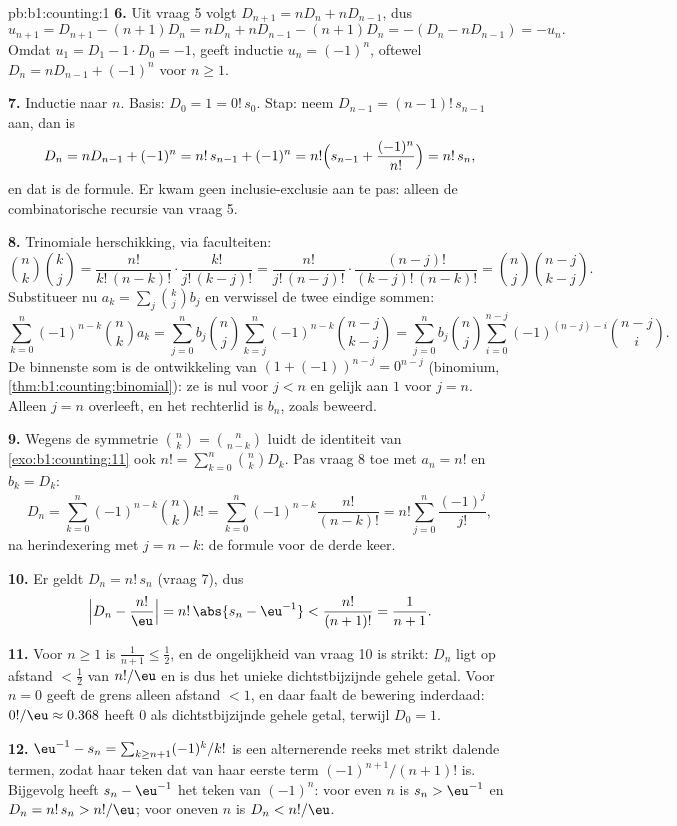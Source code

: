 \begin{solution}{pb:b1:counting:1}
\textbf{6.} Uit vraag 5 volgt $D_{n+1} = nD_n + nD_{n-1}$, dus
\[
u_{n+1} = D_{n+1} - (n+1)D_n = nD_n + nD_{n-1} - (n+1)D_n
= -(D_n - nD_{n-1}) = -u_n .
\]
Omdat $u_1 = D_1 - 1 \cdot D_0 = -1$, geeft inductie $u_n = (-1)^n$,
oftewel $D_n = nD_{n-1} + (-1)^n$ voor $n \geq 1$.

\textbf{7.} Inductie naar $n$. Basis: $D_0 = 1 = 0!\,s_0$. Stap: neem
$D_{n-1} = (n-1)!\,s_{n-1}$ aan, dan is
\[
D_n = nD_{n-1} + (-1)^n = n!\,s_{n-1} + (-1)^n
= n!\Bigl(s_{n-1} + \frac{(-1)^n}{n!}\Bigr) = n!\,s_n ,
\]
en dat is de formule. Er kwam geen inclusie-exclusie aan te pas: alleen
de combinatorische recursie van vraag 5.

\textbf{8.} Trinomiale herschikking, via faculteiten:
\[
\binom nk \binom kj
= \frac{n!}{k!\,(n-k)!} \cdot \frac{k!}{j!\,(k-j)!}
= \frac{n!}{j!\,(n-j)!} \cdot \frac{(n-j)!}{(k-j)!\,(n-k)!}
= \binom nj \binom{n-j}{k-j} .
\]
Substitueer nu $a_k = \sum_j \binom kj b_j$ en verwissel de twee eindige
sommen:
\[
\sum_{k=0}^{n} (-1)^{n-k} \binom nk a_k
= \sum_{j=0}^{n} b_j \binom nj
\sum_{k=j}^{n} (-1)^{n-k} \binom{n-j}{k-j}
= \sum_{j=0}^{n} b_j \binom nj
\sum_{i=0}^{n-j} (-1)^{(n-j)-i} \binom{n-j}{i} .
\]
De binnenste som is de ontwikkeling van $(1 + (-1))^{n-j} = 0^{n-j}$
(binomium, \cref{thm:b1:counting:binomial}): ze is nul voor $j < n$ en
gelijk aan $1$ voor $j = n$. Alleen $j = n$ overleeft, en het rechterlid
is $b_n$, zoals beweerd.

\textbf{9.} Wegens de symmetrie $\binom nk = \binom n{n-k}$ luidt de
identiteit van \cref{exo:b1:counting:11} ook $n! = \sum_{k=0}^n \binom nk
D_k$. Pas vraag 8 toe met $a_n = n!$ en $b_k = D_k$:
\[
D_n = \sum_{k=0}^{n} (-1)^{n-k} \binom nk k!
= \sum_{k=0}^{n} (-1)^{n-k} \frac{n!}{(n-k)!}
= n! \sum_{j=0}^{n} \frac{(-1)^j}{j!} ,
\]
na herindexering met $j = n - k$: de formule voor de derde keer.

\textbf{10.} Er geldt $D_n = n!\,s_n$ (vraag 7), dus
\[
\Bigl| D_n - \frac{n!}{\eu} \Bigr|
= n!\,\abs{s_n - \eu^{-1}} < \frac{n!}{(n+1)!} = \frac1{n+1} .
\]

\textbf{11.} Voor $n \geq 1$ is $\frac1{n+1} \leq \frac12$, en de
ongelijkheid van vraag 10 is strikt: $D_n$ ligt op afstand $< \frac12$
van $n!/\eu$ en is dus het unieke dichtstbijzijnde gehele getal. Voor $n
= 0$ geeft de grens alleen afstand $< 1$, en daar faalt de bewering
inderdaad: $0!/\eu \approx 0.368$ heeft $0$ als dichtstbijzijnde gehele
getal, terwijl $D_0 = 1$.

\textbf{12.} $\eu^{-1} - s_n = \sum_{k \geq n+1} (-1)^k/k!$ is een
alternerende reeks met strikt dalende termen, zodat haar teken dat van
haar eerste term $(-1)^{n+1}/(n+1)!$ is. Bijgevolg heeft $s_n - \eu^{-1}$
het teken van $(-1)^n$: voor even $n$ is $s_n > \eu^{-1}$ en $D_n =
n!\,s_n > n!/\eu$; voor oneven $n$ is $D_n < n!/\eu$.


\end{solution}
